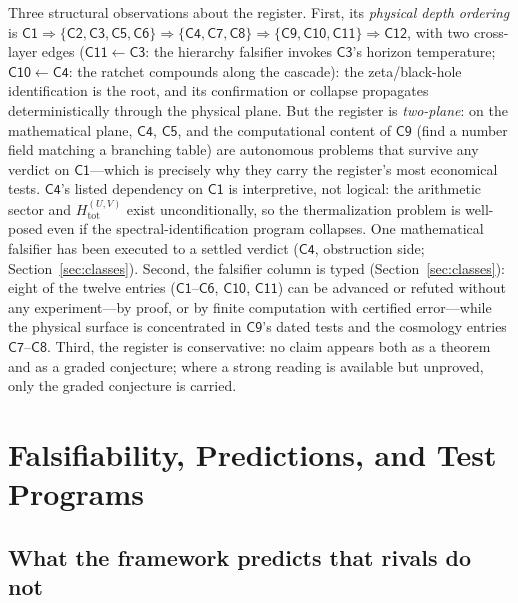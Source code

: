 Three structural observations about the register. First, its \emph{physical depth ordering}
is
$\mathsf{C1}\Rightarrow\{\mathsf{C2},\mathsf{C3},\mathsf{C5},\mathsf{C6}\}\Rightarrow
\{\mathsf{C4},\mathsf{C7},\mathsf{C8}\}\Rightarrow\{\mathsf{C9},\mathsf{C10},
\mathsf{C11}\}\Rightarrow\mathsf{C12}$, with two cross-layer edges
($\mathsf{C11}\leftarrow\mathsf{C3}$: the hierarchy falsifier invokes $\mathsf{C3}$'s horizon
temperature; $\mathsf{C10}\leftarrow\mathsf{C4}$: the ratchet compounds along the cascade):
the zeta/black-hole identification is the root, and its confirmation or collapse propagates
deterministically through the physical plane. But the register is \emph{two-plane}: on the
mathematical plane, $\mathsf{C4}$, $\mathsf{C5}$, and the computational content of
$\mathsf{C9}$ (find a number field matching a branching table) are autonomous problems
that survive any verdict on $\mathsf{C1}$---which is precisely why they carry the register's
most economical tests. $\mathsf{C4}$'s listed dependency on $\mathsf{C1}$ is interpretive, not
logical: the arithmetic sector and $H_{\mathrm{tot}}^{(U,V)}$ exist unconditionally, so the
thermalization problem is well-posed even if the spectral-identification program collapses.
One mathematical falsifier has been executed to a settled verdict
($\mathsf{C4}$, obstruction side; Section~\ref{sec:classes}).
Second, the falsifier column is typed (Section~\ref{sec:classes}): eight of the twelve
entries ($\mathsf{C1}$--$\mathsf{C6}$, $\mathsf{C10}$, $\mathsf{C11}$) can be advanced or
refuted without any experiment---by proof, or by finite computation with certified
error---while the physical surface is concentrated in $\mathsf{C9}$'s dated tests and the
cosmology entries $\mathsf{C7}$--$\mathsf{C8}$. Third, the register is conservative: no claim appears both as a theorem and as
a graded conjecture; where a strong reading is available but unproved, only the graded
conjecture is carried.

\section{Falsifiability, Predictions, and Test Programs}\label{sec:falsify}

\subsection{What the framework predicts that rivals do not}

